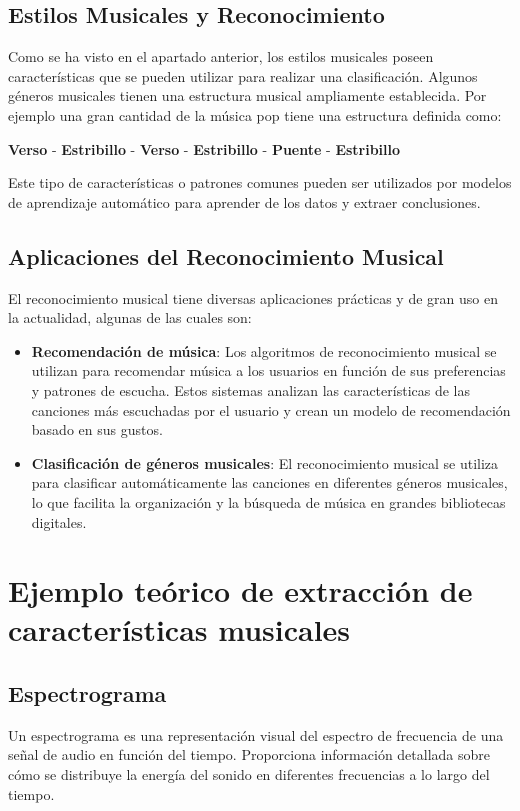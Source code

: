 \subsection{Estilos Musicales y Reconocimiento}
Como se ha visto en el apartado anterior, los estilos musicales poseen características que se pueden utilizar para realizar una clasificación.
Algunos géneros musicales tienen una estructura musical ampliamente establecida. Por ejemplo una gran cantidad de la música pop tiene una estructura definida como:

\begin{center}
\hfill \textbf{Verso} - \hfill \textbf{Estribillo} - \hfill \textbf{Verso} - \hfill \textbf{Estribillo} - \hfill \textbf{Puente} - \hfill \textbf{Estribillo}
\end{center}

Este tipo de características o patrones comunes pueden ser utilizados por modelos de aprendizaje automático para aprender de los datos y extraer conclusiones.

\subsection{Aplicaciones del Reconocimiento Musical}
El reconocimiento musical tiene diversas aplicaciones prácticas y de gran uso en la actualidad, algunas de las cuales son:

\begin{itemize}
\item \textbf{Recomendación de música}: Los algoritmos de reconocimiento musical se utilizan para recomendar música a los usuarios en función de sus preferencias y patrones de escucha. 
Estos sistemas analizan las características de las canciones más escuchadas por el usuario y crean un modelo de recomendación basado en sus gustos.

\item \textbf{Clasificación de géneros musicales}: El reconocimiento musical se utiliza para clasificar automáticamente las canciones en diferentes géneros musicales, lo que facilita la organización y la búsqueda de música en grandes bibliotecas digitales.
\end{itemize}

\section{Ejemplo teórico de extracción de características musicales}

\subsection{Espectrograma}
Un espectrograma es una representación visual del espectro de frecuencia de una señal de audio en función del tiempo. 
Proporciona información detallada sobre cómo se distribuye la energía del sonido en diferentes frecuencias a lo largo del tiempo.

